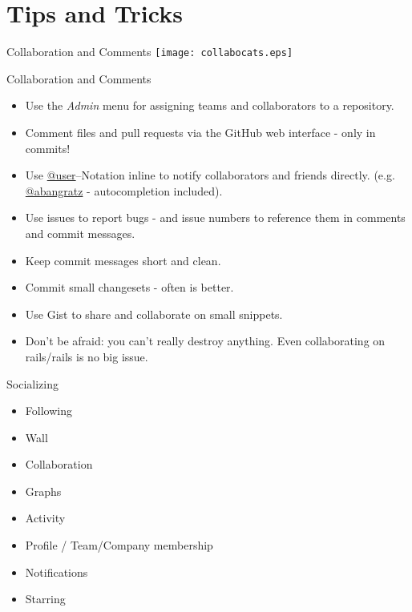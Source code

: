 \documentclass[style=husky,display=slidesnotes,clock]{powerdot}
\begin{document}
\section{Tips and Tricks}
\begin{slide}{Collaboration and Comments}
	\texttt{[image: collabocats.eps]}
\end{slide}
\begin{note}{Collaboration and Comments}
	\begin{itemize}
		\item Use the \textit{Admin} menu for assigning teams and collaborators to a repository.
		\item Comment files and pull requests via the GitHub web interface - only in commits!
		\item Use \url{@user}--Notation inline to notify collaborators and friends directly. (e.g. \url{@abangratz} -
			autocompletion included).
		\item Use issues to report bugs - and issue numbers to reference them in comments and commit messages.
		\item Keep commit messages short and clean.
		\item Commit small changesets - often is better.
		\item Use Gist to share and collaborate on small snippets.
		\item Don't be afraid: you can't really destroy anything. Even collaborating on rails/rails is no big issue.
	\end{itemize}
\end{note}
\begin{note}{Socializing}
	\begin{itemize}
		\item Following
		\item Wall
		\item Collaboration
		\item Graphs
		\item Activity
		\item Profile / Team/Company membership
		\item Notifications
		\item Starring
	\end{itemize}
\end{note}
\end{document}
